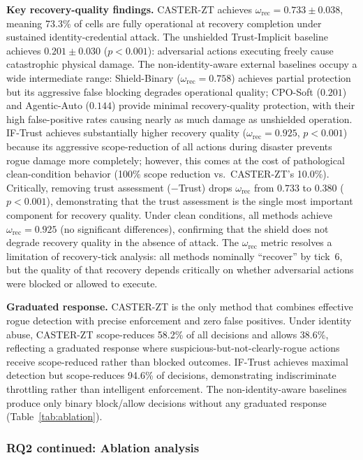 \documentclass[10pt,journal,compsoc]{IEEEtran}
\begin{document}
\noindent\textbf{Key recovery-quality findings.}
CASTER-ZT achieves $\omega_{\mathrm{rec}} = 0.733\pm0.038$, meaning 73.3\% of cells are fully operational at recovery completion under sustained identity-credential attack.
The unshielded Trust-Implicit baseline achieves $0.201\pm0.030$ ($p < 0.001$): adversarial actions executing freely cause catastrophic physical damage.
The non-identity-aware external baselines occupy a wide intermediate range: Shield-Binary ($\omega_{\mathrm{rec}} = 0.758$) achieves partial protection but its aggressive false blocking degrades operational quality; CPO-Soft ($0.201$) and Agentic-Auto ($0.144$) provide minimal recovery-quality protection, with their high false-positive rates causing nearly as much damage as unshielded operation.
IF-Trust achieves substantially higher recovery quality ($\omega_{\mathrm{rec}} = 0.925$, $p < 0.001$) because its aggressive scope-reduction of all actions during disaster prevents rogue damage more completely; however, this comes at the cost of pathological clean-condition behavior (100\% scope reduction vs.\ CASTER-ZT's 10.0\%).
Critically, removing trust assessment ($-$Trust) drops $\omega_{\mathrm{rec}}$ from $0.733$ to $0.380$ ($p < 0.001$), demonstrating that the trust assessment is the single most important component for recovery quality.
Under clean conditions, all methods achieve $\omega_{\mathrm{rec}} = 0.925$ (no significant differences), confirming that the shield does not degrade recovery quality in the absence of attack.
The $\omega_{\mathrm{rec}}$ metric resolves a limitation of recovery-tick analysis: all methods nominally ``recover'' by tick~6, but the quality of that recovery depends critically on whether adversarial actions were blocked or allowed to execute.

\noindent\textbf{Graduated response.}
CASTER-ZT is the only method that combines effective rogue detection with precise enforcement and zero false positives.
Under identity abuse, CASTER-ZT scope-reduces 58.2\% of all decisions and allows 38.6\%, reflecting a graduated response where suspicious-but-not-clearly-rogue actions receive scope-reduced rather than blocked outcomes.
IF-Trust achieves maximal detection but scope-reduces 94.6\% of decisions, demonstrating indiscriminate throttling rather than intelligent enforcement.
The non-identity-aware baselines produce only binary block/allow decisions without any graduated response (Table~\ref{tab:ablation}).

\subsubsection{RQ2 continued: Ablation analysis}
\end{document}
